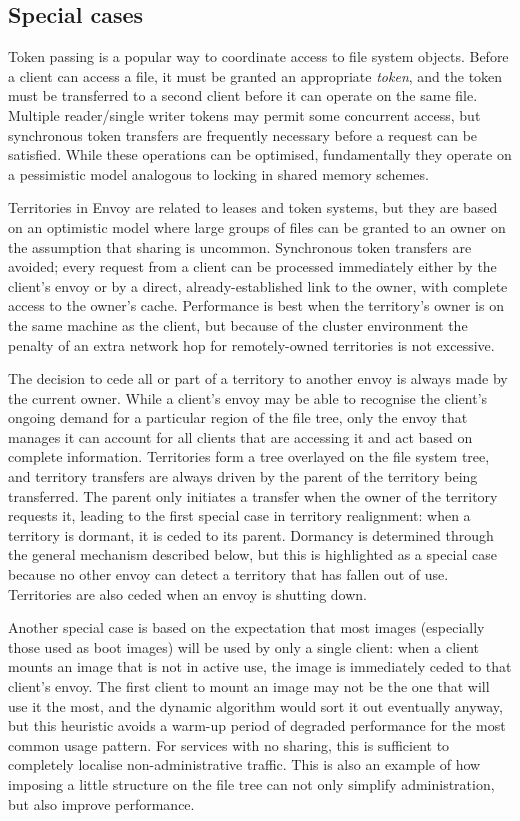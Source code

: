 \subsection{Special cases}

Token passing is a popular way to coordinate access to file system objects. Before a client can access a file, it must be granted an appropriate \emph{token}, and the token must be transferred to a second client before it can operate on the same file. Multiple reader/single writer tokens may permit some concurrent access, but synchronous token transfers are frequently necessary before a request can be satisfied. While these operations can be optimised, fundamentally they operate on a pessimistic model analogous to locking in shared memory schemes.

Territories in Envoy are related to leases and token systems, but they are based on an optimistic model where large groups of files can be granted to an owner on the assumption that sharing is uncommon. Synchronous token transfers are avoided; every request from a client can be processed immediately either by the client's envoy or by a direct, already-established link to the owner, with complete access to the owner's cache. Performance is best when the territory's owner is on the same machine as the client, but because of the cluster environment the penalty of an extra network hop for remotely-owned territories is not excessive.

The decision to cede all or part of a territory to another envoy is always made by the current owner. While a client's envoy may be able to recognise the client's ongoing demand for a particular region of the file tree, only the envoy that manages it can account for all clients that are accessing it and act based on complete information. Territories form a tree overlayed on the file system tree, and territory transfers are always driven by the parent of the territory being transferred. The parent only initiates a transfer when the owner of the territory requests it, leading to the first special case in territory realignment: when a territory is dormant, it is ceded to its parent. Dormancy is determined through the general mechanism described below, but this is highlighted as a special case because no other envoy can detect a territory that has fallen out of use. Territories are also ceded when an envoy is shutting down.

Another special case is based on the expectation that most images (especially those used as boot images) will be used by only a single client: when a client mounts an image that is not in active use, the image is immediately ceded to that client's envoy. The first client to mount an image may not be the one that will use it the most, and the dynamic algorithm would sort it out eventually anyway, but this heuristic avoids a warm-up period of degraded performance for the most common usage pattern. For services with no sharing, this is sufficient to completely localise non-administrative traffic. This is also an example of how imposing a little structure on the file tree can not only simplify administration, but also improve performance.

